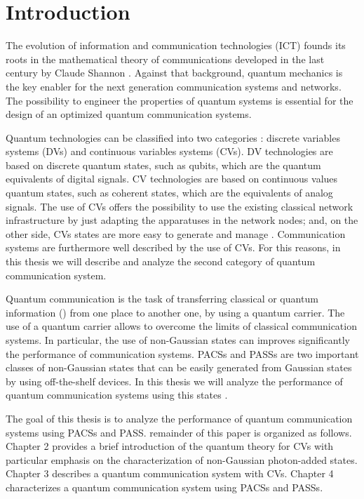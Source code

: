 \chapter{Introduction}
    The evolution of information and communication technologies (ICT) founds its roots in the mathematical
    theory of communications developed in the last century by Claude Shannon \cite{shannon}.
    Against that background, quantum mechanics is the key enabler for the next generation 
    communication systems and networks.
    The possibility to engineer the properties of quantum systems \cite{helstrom3} is essential for 
    the design of an optimized quantum communication systems.
    
    Quantum technologies can be classified into two categories \cite{tesiGuerrini}: discrete 
    variables systems (DVs) and continuous variables systems (CVs). DV technologies are based
    on discrete quantum states, such as qubits, which are the quantum equivalents of digital
    signals. CV technologies are based on continuous values quantum states, such as 
    coherent states, which are the equivalents of analog signals.
    The use of CVs offers the possibility to use the existing classical network
    infrastructure by just adapting the apparatuses in the network nodes; and, on the other
    side, CVs states are more easy to generate and manage \cite{tesiGuerrini}. Communication
    systems are furthermore well described by the use of CVs. 
    For this reasons, in this thesis we will describe and analyze the second category of quantum
    communication system.

    Quantum communication is the task of transferring classical or quantum information
    (\cite{GueChiWinCon:C20,GueChiWinCon:C19,GueChiCon:C18,ChiConWin:J20}) from one place to another
    one, by using a quantum carrier.
    The use of a quantum carrier allows to overcome the 
    limits of classical communication systems.
    In particular, the use of non-Gaussian states
    can improves significantly the performance of communication systems. 
    PACSs and PASSs are two important classes of non-Gaussian states that can be easily generated 
    from Gaussian states by using off-the-shelf devices. In this thesis we will analyze the 
    performance of quantum communication systems using this states 
    \cite{PACSDisc,GueChiWinCon:C20,GueChiWinCon:C19,GueChiCon:C18}.

    The goal of this thesis is to analyze the performance of quantum 
    communication systems using PACSs and PASS. remainder of this paper is organized as follows. 
    Chapter 2 provides a brief introduction of the quantum theory for CVs with particular emphasis on
    the characterization of non-Gaussian photon-added states. Chapter 3 describes a quantum communication 
    system with CVs. Chapter 4 characterizes a quantum communication system using PACSs and PASSs.
